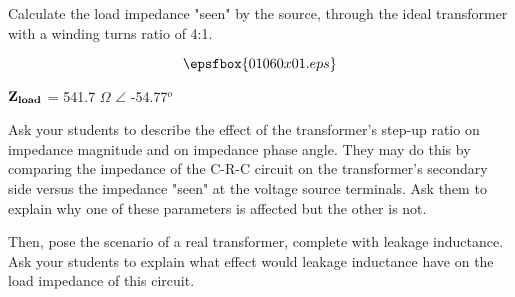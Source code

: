 

Calculate the load impedance "seen" by the source, through the ideal transformer with a winding turns ratio of 4:1.

$$\epsfbox{01060x01.eps}$$







${\bf Z_{load}}$ = 541.7 $\Omega$ $\angle$ -54.77$^{o}$







Ask your students to describe the effect of the transformer's step-up ratio on impedance magnitude and on impedance phase angle.  They may do this by comparing the impedance of the C-R-C circuit on the transformer's secondary side versus the impedance "seen" at the voltage source terminals.  Ask them to explain why one of these parameters is affected but the other is not.

Then, pose the scenario of a real transformer, complete with leakage inductance.  Ask your students to explain what effect would leakage inductance have on the load impedance of this circuit.




